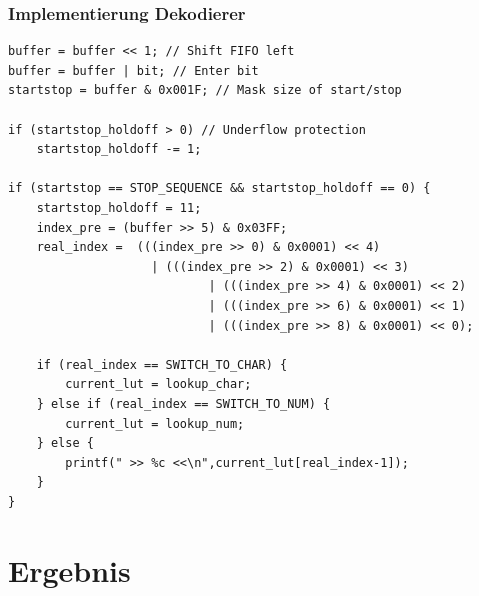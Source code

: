 \documentclass{beamer}
\begin{document}


\begin{frame}[fragile]
	\frametitle{Implementierung Dekodierer}
	
	\begin{lstlisting}[basicstyle=\tiny,style=CStyle]			
buffer = buffer << 1; // Shift FIFO left
buffer = buffer | bit; // Enter bit
startstop = buffer & 0x001F; // Mask size of start/stop

if (startstop_holdoff > 0) // Underflow protection
	startstop_holdoff -= 1;

if (startstop == STOP_SEQUENCE && startstop_holdoff == 0) {
	startstop_holdoff = 11;
	index_pre = (buffer >> 5) & 0x03FF; 
	real_index =  (((index_pre >> 0) & 0x0001) << 4) 
		   		   	| (((index_pre >> 2) & 0x0001) << 3) 
							| (((index_pre >> 4) & 0x0001) << 2) 
							| (((index_pre >> 6) & 0x0001) << 1) 
							| (((index_pre >> 8) & 0x0001) << 0);

	if (real_index == SWITCH_TO_CHAR) {
		current_lut = lookup_char;
	} else if (real_index == SWITCH_TO_NUM) {
		current_lut = lookup_num;
	} else {
		printf(" >> %c <<\n",current_lut[real_index-1]); 
	}
}

\end{lstlisting}
\end{frame}

\section{Ergebnis}
\end{document}
